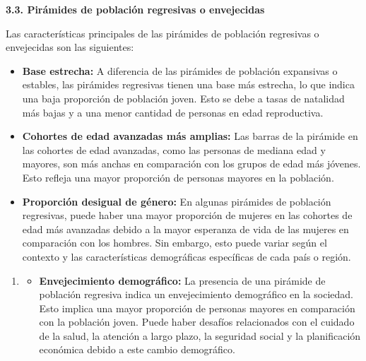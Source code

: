 \documentclass[8pt,a4paper]{beamer}
\begin{document}
{\begin{frame}{}
\begin{block}{\textbf{3.3. Pirámides de población regresivas o envejecidas}}
\begin{enumerate}
Las características principales de las pirámides de población regresivas o envejecidas son las siguientes:
\begin{itemize}
\justifying
\item[\ding{65}] \textbf{Base estrecha:} A diferencia de las pirámides de población expansivas o estables, las pirámides regresivas tienen una base más estrecha, lo que indica una baja proporción de población joven. Esto se debe a tasas de natalidad más bajas y a una menor cantidad de personas en edad reproductiva.

\item[\ding{65}] \textbf{Cohortes de edad avanzadas más amplias:} Las barras de la pirámide en las cohortes de edad avanzadas, como las personas de mediana edad y mayores, son más anchas en comparación con los grupos de edad más jóvenes. Esto refleja una mayor proporción de personas mayores en la población.

\item[\ding{65}] \textbf{Proporción desigual de género:} En algunas pirámides de población regresivas, puede haber una mayor proporción de mujeres en las cohortes de edad más avanzadas debido a la mayor esperanza de vida de las mujeres en comparación con los hombres. Sin embargo, esto puede variar según el contexto y las características demográficas específicas de cada país o región.
\end{itemize}

\end{enumerate}
\end{block}
\end{frame}

\begin{frame}{}
\begin{block}{}
\begin{enumerate}
\justifying
\item[{}] 
\begin{itemize}
\justifying
\item[\ding{65}] \textbf{Envejecimiento demográfico:} La presencia de una pirámide de población regresiva indica un envejecimiento demográfico en la sociedad. Esto implica una mayor proporción de personas mayores en comparación con la población joven. Puede haber desafíos relacionados con el cuidado de la salud, la atención a largo plazo, la seguridad social y la planificación económica debido a este cambio demográfico.


\end{itemize}
\end{enumerate}
\end{block}
\end{frame}}
\end{document}
